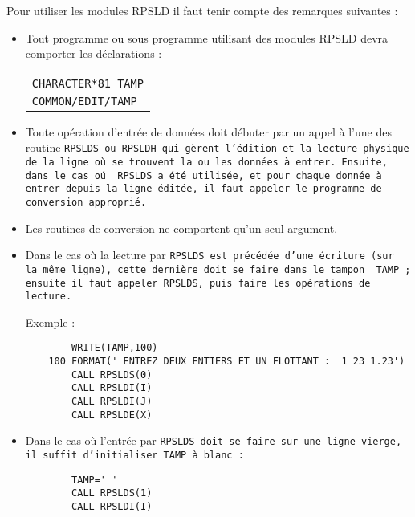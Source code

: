 \documentclass[a4paper,12pt,titlepage]{article}
\begin{document}
Pour utiliser les modules RPSLD il faut tenir compte des remarques suivantes
: 
\begin{itemize}
  \item Tout  programme ou sous programme utilisant des modules  RPSLD 
    devra comporter les d\'e\-cla\-rations :
 
    \begin{center}\begin{tabular}{l}
                   \verb+CHARACTER*81 TAMP+\\
                   \verb+COMMON/EDIT/TAMP+
    \end{tabular}\end{center}

  \item Toute op\'eration d'entr\'ee de donn\'ees doit d\'ebuter par un
    appel \`a l'une des routine \tt RPSLDS\rm\ ou \tt RPSLDH\rm\ qui
    g\`erent l'\'edition et la lecture physique de la ligne o\`u se trouvent
    la ou les donn\'ees \`a entrer.  Ensuite, dans le cas o\'u \tt
    RPSLDS\rm\ a \'et\'e utilis\'ee, et pour chaque donn\'ee \`a entrer
    depuis la ligne \'edit\'ee, il faut appeler le programme de conversion
    appropri\'e.

  \item Les routines de conversion ne  comportent qu'un seul argument.

  \item Dans le cas o\`u la lecture par \tt RPSLDS\rm\ est pr\'ec\'ed\'ee
    d'une \'ecriture (sur la m\^eme ligne), cette derni\`ere doit se faire
    dans le tampon \tt
TAMP\rm\ ; ensuite il faut appeler \tt RPSLDS\rm, puis faire les
    op\'erations de lecture.

       \pagebreak 
              Exemple : 

    \begin{verbatim}
        WRITE(TAMP,100)
    100 FORMAT(' ENTREZ DEUX ENTIERS ET UN FLOTTANT :  1 23 1.23')
        CALL RPSLDS(0)
        CALL RPSLDI(I)
        CALL RPSLDI(J)
        CALL RPSLDE(X)
    \end{verbatim}

  \item Dans le cas o\`u l'entr\'ee par \tt RPSLDS\rm\ doit se faire sur une
    ligne vierge, il suffit d'initialiser TAMP \`a blanc : 

    \begin{verbatim}
        TAMP=' '
        CALL RPSLDS(1)
        CALL RPSLDI(I)
    \end{verbatim}


\end{itemize}
\end{document}
